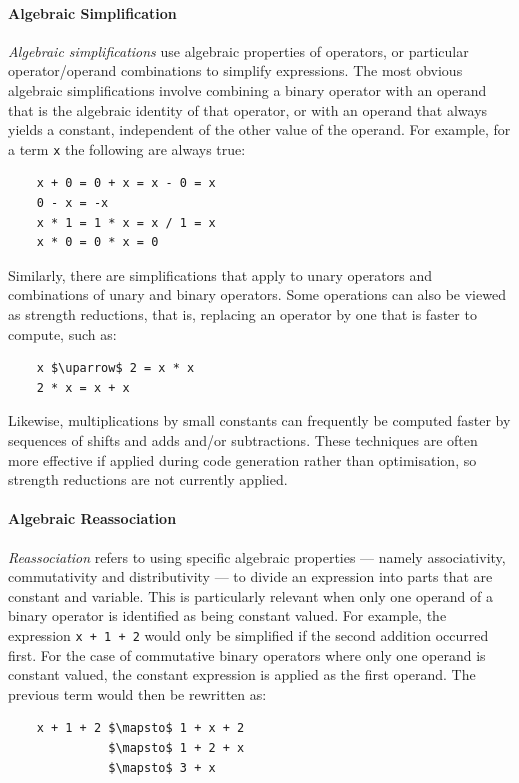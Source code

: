 \paragraph{Algebraic Simplification}

\emph{Algebraic simplifications} use algebraic properties of operators, or
particular operator/operand combinations to simplify expressions. The most
obvious algebraic simplifications involve combining a binary operator with an
operand that is the algebraic identity of that operator, or with an operand that
always yields a constant, independent of the other value of the operand. For
example, for a term \texttt{x} the following are always true:
%
\begin{lstlisting}[style=Haskell,numbers=none]
%\bf$\langle$ algebraic simplification $\rangle$%
    x + 0 = 0 + x = x - 0 = x
    0 - x = -x
    x * 1 = 1 * x = x / 1 = x
    x * 0 = 0 * x = 0
\end{lstlisting}
%
Similarly, there are simplifications that apply to unary operators and
combinations of unary and binary operators. Some operations can also be viewed
as strength reductions, that is, replacing an operator by one that is faster to
compute, such as:
%
\begin{lstlisting}[style=Haskell,numbers=none,mathescape]
%\bf$\langle$ strength reduction $\rangle$%
    x $\uparrow$ 2 = x * x
    2 * x = x + x
\end{lstlisting}
%
Likewise, multiplications by small constants can frequently be computed faster
by sequences of shifts and adds and/or subtractions. These techniques are often
more effective if applied during code generation rather than optimisation, so
strength reductions are not currently applied.


\paragraph{Algebraic Reassociation}

\emph{Reassociation} refers to using specific algebraic properties --- namely
associativity, commutativity and distributivity --- to divide an expression into
parts that are constant and variable.
This is particularly relevant when only one operand of a binary
operator is identified as being constant valued. For example, the expression
\lstinline{x + 1 + 2} would only be simplified if the second addition occurred
first. For the case of commutative binary operators where only one operand is
constant valued, the constant expression is applied as the first operand. The
previous term would then be rewritten as:
%
\begin{lstlisting}[style=Haskell,numbers=none,mathescape]
%\bf$\langle$ algebraic reassociation $\rangle$%
    x + 1 + 2 $\mapsto$ 1 + x + 2
              $\mapsto$ 1 + 2 + x
              $\mapsto$ 3 + x
\end{lstlisting}


